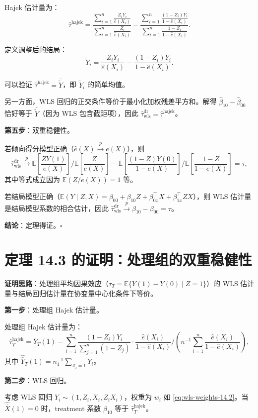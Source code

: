 Hajek 估计量为：
\[
\hat\tau^{\text{hajek}} = \frac{\sum_{i=1}^n \frac{Z_i Y_i}{\hat{e}(X_i)}}{\sum_{i=1}^n \frac{Z_i}{\hat{e}(X_i)}} - \frac{\sum_{i=1}^n \frac{(1-Z_i) Y_i}{1-\hat{e}(X_i)}}{\sum_{i=1}^n \frac{1-Z_i}{1-\hat{e}(X_i)}}.
\]

定义调整后的结局：
\[
\tilde{Y}_i = \frac{Z_i Y_i}{\hat{e}(X_i)} - \frac{(1-Z_i) Y_i}{1-\hat{e}(X_i)}.
\]

可以验证 $\hat\tau^{\text{hajek}} = \bar{\tilde{Y}}$，即 $\tilde{Y}_i$ 的简单均值。

另一方面，WLS 回归的正交条件等价于最小化加权残差平方和。解得 $\hat\beta_{10} - \hat\beta_{00}$ 恰好等于 $\bar{\tilde{Y}}$（因为 WLS 包含截距项），因此 $\hat\tau_{\text{wls}}^{\text{dr}} = \hat\tau^{\text{hajek}}$。

\textbf{第五步}：双重稳健性。

若倾向得分模型正确（$\hat{e}(X) \xrightarrow{p} e(X)$），则
\[
\hat\tau_{\text{wls}}^{\text{dr}} \xrightarrow{p} \mathbb{E}\left[ \frac{Z Y(1)}{e(X)} \right] / \mathbb{E}\left[ \frac{Z}{e(X)} \right] - \mathbb{E}\left[ \frac{(1-Z) Y(0)}{1-e(X)} \right] / \mathbb{E}\left[ \frac{1-Z}{1-e(X)} \right] = \tau,
\]
其中等式成立因为 $\mathbb{E}(Z / e(X)) = 1$ 等。

若结局模型正确（$\mathbb{E}(Y \mid Z, X) = \beta_{00} + \beta_{10} Z + \beta_{0x}^\top X + \beta_{1x}^\top Z X$），则 WLS 估计量是结局模型系数的相合估计，因此 $\hat\tau_{\text{wls}}^{\text{dr}} \xrightarrow{p} \beta_{10} - \beta_{00} = \tau$。

\textbf{结论}：定理得证。$\square$

\section{定理 14.3 的证明：处理组的双重稳健性}\label{sec:appendix-thm-14-3-proof}

\textbf{证明思路}：处理组平均因果效应（$\tau_T = \mathbb{E}\{Y(1) - Y(0) \mid Z=1\}$）的 WLS 估计量与结局回归估计量在协变量中心化条件下等价。

\textbf{第一步}：处理组 Hajek 估计量。

处理组 Hajek 估计量为：
\[
\hat\tau_T^{\text{hajek}} = \hat{\bar{Y}}_T(1) - \sum_{i=1}^n \frac{(1-Z_i) Y_i}{\sum_{j=1}^n (1-Z_j)} \cdot \frac{\hat{e}(X_i)}{1-\hat{e}(X_i)} / \left( n^{-1} \sum_{i=1}^n \frac{\hat{e}(X_i)}{1-\hat{e}(X_i)} \right),
\]
其中 $\hat{\bar{Y}}_T(1) = n_1^{-1}\sum_{Z_i=1} Y_i$。

\textbf{第二步}：WLS 回归。

考虑 WLS 回归 $Y_i \sim (1, Z_i, X_i, Z_i X_i)$，权重为 $w_i$ 如 \cref{eq:wls-weights-14.2}。当 $\hat{\bar{X}}(1)=0$ 时，treatment 系数 $\hat\beta_{10}$ 等于 $\hat\tau_T^{\text{hajek}}$。

